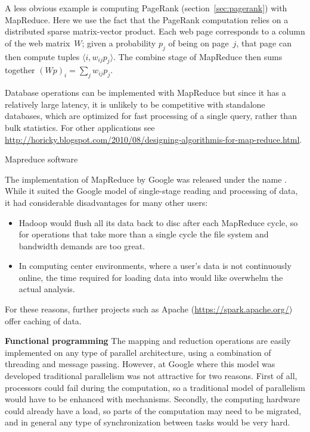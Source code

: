 A less obvious example is computing PageRank
(section~\ref{sec:pagerank}) with MapReduce. Here we use the fact that
the PageRank computation relies on a distributed sparse matrix-vector
product. Each web page corresponds to a column of the web matrix~$W$;
given a probability $p_j$ of being on page~$j$, that page can then
compute tuples $\langle i,w_{ij}p_j\rangle$. The combine stage of MapReduce
then sums together $(Wp)_i=\sum_j w_{ij}p_j$.

Database operations can be implemented with MapReduce but since it has
a relatively large latency, it is unlikely to be competitive with
standalone databases, which are optimized for fast processing of a
single query, rather than bulk statistics. For other applications see
\url{http://horicky.blogspot.com/2010/08/designing-algorithmis-for-map-reduce.html}.

 {Mapreduce software}

The implementation of MapReduce by Google was released under the name .
While it suited the Google model of single-stage reading and processing of data,
it had considerable disadvantages for many other users:
\begin{itemize}
\item Hadoop would flush all its data back to disc after each MapReduce cycle, so
  for operations that take more than a single cycle the file system
  and bandwidth demands are too great.
\item In computing center environments, where a user's data is not continuously online,
  the time required for loading data into  would like overwhelm the
  actual analysis.
\end{itemize}
For these reasons, further projects such as Apache  (\url{https://spark.apache.org/})
offer caching of data.

 {\bf Functional programming}
%
The mapping and reduction operations are easily implemented on any
type of parallel architecture, using a combination of threading and
message passing. However, at Google where this model was developed
traditional parallelism was not attractive for two reasons. First of
all, processors could fail during the computation, so a traditional
model of parallelism would have to be enhanced with  mechanisms. Secondly, the computing hardware could
already have a load, so parts of the computation may need to be
migrated, and in general any type of synchronization between tasks
would be very hard.

